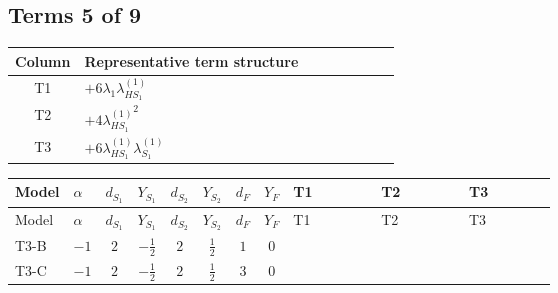 \documentclass[8pt]{article}
\begin{document}
\begin{landscape}
\subsection*{Terms 5 of 9}
\begin{center}
\begin{tabular}{@{}c >{\raggedright\arraybackslash}p{0.82\linewidth}@{}}
\toprule
Column & Representative term structure \\
\midrule
T1 & \(\displaystyle +6 {\lambda_1} {\lambda_{HS_1}^{(1)}}\) \\
\midrule
T2 & \(\displaystyle +4 {\lambda_{HS_1}^{(1)}}^2\) \\
\midrule
T3 & \(\displaystyle +6 {\lambda_{HS_1}^{(1)}} {\lambda_{S_1}^{(1)}}\) \\
\midrule
\bottomrule
\end{tabular}
\end{center}
\smallskip
\tiny
\begin{longtable}{@{}llcccccc >{\raggedright\arraybackslash}p{0.21\linewidth} >{\raggedright\arraybackslash}p{0.21\linewidth} >{\raggedright\arraybackslash}p{0.21\linewidth}@{}}
\toprule
Model & $\alpha$ & $d_{S_1}$ & $Y_{S_1}$ & $d_{S_2}$ & $Y_{S_2}$ & $d_F$ & $Y_F$ & T1 & T2 & T3 \\
\midrule
\endfirsthead
\toprule
Model & $\alpha$ & $d_{S_1}$ & $Y_{S_1}$ & $d_{S_2}$ & $Y_{S_2}$ & $d_F$ & $Y_F$ & T1 & T2 & T3 \\
\midrule
\endhead
T3-B & $-1$ & $2$ & $-\frac{1}{2}$ & $2$ & $\frac{1}{2}$ & $1$ & $0$ & \scriptsize\adjustbox{max width=\linewidth}{$\begin{gathered} +6 {\lambda_1} {\lambda_{HS_1}^{(1)}}\end{gathered}$} & \scriptsize\adjustbox{max width=\linewidth}{$\begin{gathered} +4 {\lambda_{HS_1}^{(1)}}^2\end{gathered}$} & \scriptsize\adjustbox{max width=\linewidth}{$\begin{gathered} +6 {\lambda_{HS_1}^{(1)}} {\lambda_{S_1}^{(1)}}\end{gathered}$} \\
\midrule
T3-C & $-1$ & $2$ & $-\frac{1}{2}$ & $2$ & $\frac{1}{2}$ & $3$ & $0$ & \scriptsize\adjustbox{max width=\linewidth}{$\begin{gathered} +6 {\lambda_1} {\lambda_{HS_1}^{(1)}}\end{gathered}$} & \scriptsize\adjustbox{max width=\linewidth}{$\begin{gathered} +4 {\lambda_{HS_1}^{(1)}}^2\end{gathered}$} & \scriptsize\adjustbox{max width=\linewidth}{$\begin{gathered} +6 {\lambda_{HS_1}^{(1)}} {\lambda_{S_1}^{(1)}}\end{gathered}$} \\

\end{longtable}
\end{landscape}
\end{document}
